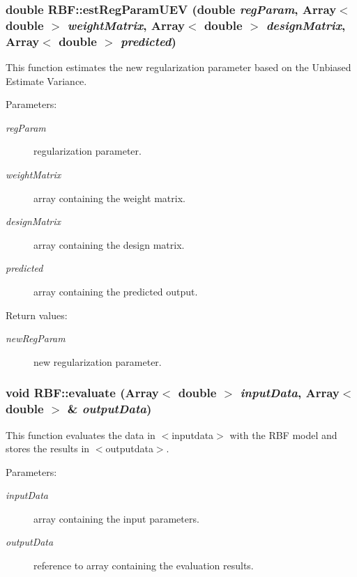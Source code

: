 \subsubsection{\setlength{\rightskip}{0pt plus 5cm}double RBF::est\-Reg\-Param\-UEV (double {\em reg\-Param}, Array$<$ double $>$ {\em weight\-Matrix}, Array$<$ double $>$ {\em design\-Matrix}, Array$<$ double $>$ {\em predicted})\hspace{0.3cm}{\tt  [static]}}\label{classRBF_e13}


This function estimates the new regularization parameter based on the Unbiased Estimate Variance. 

\begin{Desc}
\item[Parameters:]
\begin{description}
\item[{\em reg\-Param}]regularization parameter. \item[{\em weight\-Matrix}]array containing the weight matrix. \item[{\em design\-Matrix}]array containing the design matrix. \item[{\em predicted}]array containing the predicted output. \end{description}
\end{Desc}
\begin{Desc}
\item[Return values:]
\begin{description}
\item[{\em new\-Reg\-Param}]new regularization parameter.\end{description}
\end{Desc}
\subsubsection{\setlength{\rightskip}{0pt plus 5cm}void RBF::evaluate (Array$<$ double $>$ {\em input\-Data}, Array$<$ double $>$ \& {\em output\-Data})}\label{classRBF_a7}


This function evaluates the data in $<$inputdata$>$ with the RBF model and stores the results in $<$outputdata$>$. 

\begin{Desc}
\item[Parameters:]
\begin{description}
\item[{\em input\-Data}]array containing the input parameters. \item[{\em output\-Data}]reference to array containing the evaluation results.\end{description}
\end{Desc}
